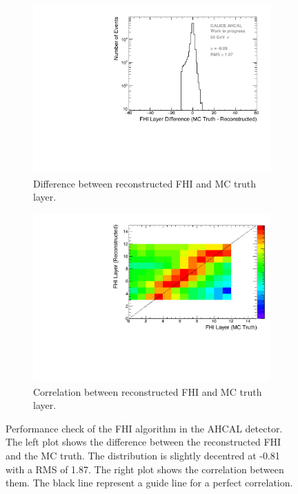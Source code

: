 \begin{figure}[htbp!]
	\begin{subfigure}[t]{0.45\textwidth}
		\centering
		\includegraphics[width=1\textwidth]{chap5/fig_AHCAL_timing/Pions/ShowerStart_Difference_noOptimisation.pdf}
		\caption{Difference between reconstructed FHI and MC truth layer.}\label{fig:Diff_FHI_RecoMC}
	\end{subfigure}
	\hfill
	\begin{subfigure}[t]{0.45\textwidth}
		\centering
		\includegraphics[width=1\textwidth]{chap5/fig_AHCAL_timing/Pions/ShowerStart_Difference_noOptimisation_2D.pdf}
		\caption{Correlation between reconstructed FHI and MC truth layer.}\label{fig:Corr_FHI_RecoMC}
	\end{subfigure}
	\caption{Performance check of the FHI algorithm in the AHCAL detector. The left plot shows the difference between the reconstructed FHI and the MC truth. The distribution is slightly decentred at -0.81 with a RMS of 1.87. The right plot shows the correlation between them. The black line represent a guide line for a perfect correlation.}
	\label{fig:FHIAlgo}
\end{figure}

